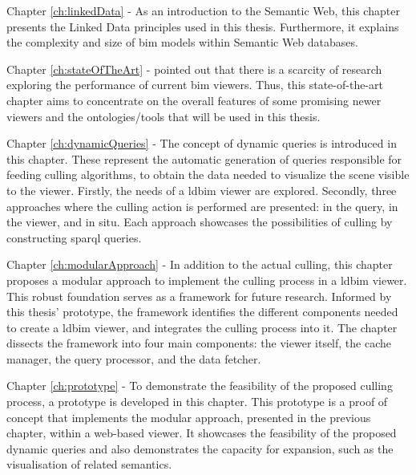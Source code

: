 \begin{refsection}
\begin{multicols}{2}
        \textsf{Chapter \ref{ch:linkedData} -}
        As an introduction to the Semantic Web, this chapter presents the Linked Data principles used in this thesis. Furthermore, it explains the complexity and size of \ac{bim} models within Semantic Web databases.

        \textsf{Chapter \ref{ch:stateOfTheArt} -}
        \cite{Johansson2015} pointed out that there is a scarcity of research exploring the performance of current \ac{bim} viewers. Thus, this state-of-the-art chapter aims to concentrate on the overall features of some promising newer viewers and the ontologies/tools that will be used in this thesis.

        \textsf{Chapter \ref{ch:dynamicQueries} -}
        The concept of dynamic queries is introduced in this chapter. These represent the automatic generation of queries responsible for feeding culling algorithms, to obtain the data needed to visualize the scene visible to the viewer. Firstly, the needs of a \ac{ldbim} viewer are explored. Secondly, three approaches where the culling action is performed are presented: in the query, in the viewer, and in situ. Each approach showcases the possibilities of culling by constructing \ac{sparql} queries.

        \textsf{Chapter \ref{ch:modularApproach} -}
        In addition to the actual culling, this chapter proposes a modular approach to implement the culling process in a \ac{ldbim} viewer. This robust foundation serves as a framework for future research. Informed by this thesis' prototype, the framework identifies the different components needed to create a \ac{ldbim} viewer, and integrates the culling process into it. The chapter dissects the framework into four main components: the viewer itself, the cache manager, the query processor, and the data fetcher.

        \textsf{Chapter \ref{ch:prototype} -}
        To demonstrate the feasibility of the proposed culling process, a prototype is developed in this chapter. This prototype is a proof of concept that implements the modular approach, presented in the previous chapter, within a web-based viewer. It showcases the feasibility of the proposed dynamic queries and also demonstrates the capacity for expansion, such as the visualisation of related semantics.


\end{multicols}
\end{refsection}
